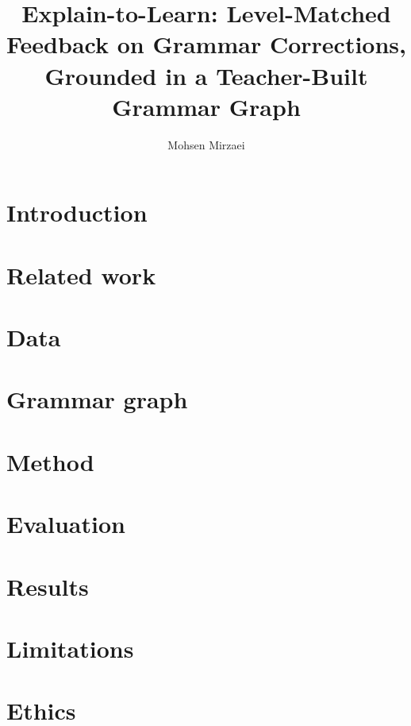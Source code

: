 \documentclass[11pt]{article}
\title{Explain-to-Learn: Level-Matched Feedback on Grammar Corrections,\\
  Grounded in a Teacher-Built Grammar Graph}
\author{Mohsen Mirzaei}
\begin{document}
\maketitle

\begin{abstract}
\end{abstract}

\section{Introduction}
\label{sec:introduction}

\section{Related work}
\label{sec:related-work}

\section{Data}
\label{sec:data}

\section{Grammar graph}
\label{sec:grammar-graph}

\section{Method}
\label{sec:method}

\section{Evaluation}
\label{sec:evaluation}

\section{Results}
\label{sec:results}

\section*{Limitations}

\section*{Ethics}

\nocite{yannakoudakis-etal-2018-developing,yannakoudakis-etal-2011-new,bryant-etal-2019-bea,bryant-etal-2017-automatic,song-etal-2024-gee,kochmar-etal-2025-findings,hu-etal-2021-lora}


\end{document}
